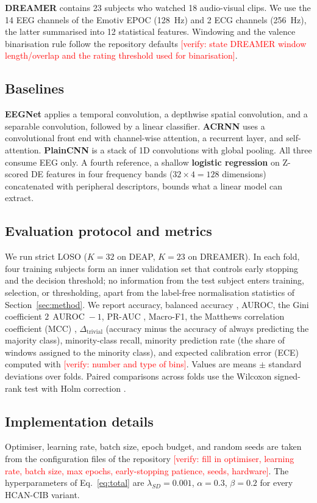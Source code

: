 \documentclass[a4paper,fleqn]{cas-sc}
\newcommand{\vrf}[1]{\textcolor{red}{[verify: #1]}}
\DeclareMathOperator{\AUROC}{AUROC}
\begin{document}
\noindent\textbf{DREAMER} \citep{katsigiannis2018dreamer} contains 23 subjects who watched 18 audio-visual clips. We use the 14 EEG channels of the Emotiv EPOC (128~Hz) and 2 ECG channels (256~Hz), the latter summarised into 12 statistical features. Windowing and the valence binarisation rule follow the repository defaults \vrf{state DREAMER window length/overlap and the rating threshold used for binarisation}.

\subsection{Baselines}
\textbf{EEGNet} \citep{lawhern2018eegnet} applies a temporal convolution, a depthwise spatial convolution, and a separable convolution, followed by a linear classifier. \textbf{ACRNN} \citep{tao2020acrnn} uses a convolutional front end with channel-wise attention, a recurrent layer, and self-attention. \textbf{PlainCNN} is a stack of 1D convolutions with global pooling. All three consume EEG only. A fourth reference, a shallow \textbf{logistic regression} on Z-scored DE features in four frequency bands ($32\times4=128$ dimensions) concatenated with peripheral descriptors, bounds what a linear model can extract.

\subsection{Evaluation protocol and metrics}
We run strict LOSO ($K=32$ on DEAP, $K=23$ on DREAMER). In each fold, four training subjects form an inner validation set that controls early stopping and the decision threshold; no information from the test subject enters training, selection, or thresholding, apart from the label-free normalisation statistics of Section~\ref{sec:method}. We report accuracy, balanced accuracy \citep{brodersen2010balanced}, AUROC, the Gini coefficient $2\,\AUROC-1$, PR-AUC \citep{saito2015pr}, Macro-F1, the Matthews correlation coefficient (MCC) \citep{chicco2020mcc}, $\Delta_{\mathrm{trivial}}$ (accuracy minus the accuracy of always predicting the majority class), minority-class recall, minority prediction rate (the share of windows assigned to the minority class), and expected calibration error (ECE) \citep{guo2017calibration} computed with \vrf{number and type of bins}. Values are means $\pm$ standard deviations over folds. Paired comparisons across folds use the Wilcoxon signed-rank test \citep{wilcoxon1945} with Holm correction \citep{holm1979}.

\subsection{Implementation details}
Optimiser, learning rate, batch size, epoch budget, and random seeds are taken from the configuration files of the repository \vrf{fill in optimiser, learning rate, batch size, max epochs, early-stopping patience, seeds, hardware}. The hyperparameters of Eq.~\eqref{eq:total} are $\lambda_{SD}=0.001$, $\alpha=0.3$, $\beta=0.2$ for every HCAN-CIB variant.
\end{document}
